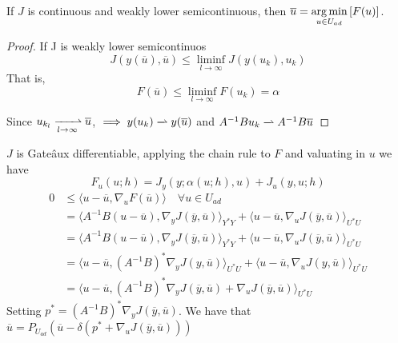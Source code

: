 \begin{proposition}
	If $J$ is continuous and weakly lower semicontinuous, then 	$\overline{u}={\displaystyle {\underset {u\in U_{ad}}{\operatorname {arg\,min} }}\left[F(u)\right]}$.
	\begin{proof}
		If J is weakly lower semicontinuos 
			\[
				J(y(\overline{u}), \overline{u})\leq \liminf_{l\rightarrow \infty} J(y(u_k),u_k)
			\]
		That is, 
		\[
			F(\overline{u}) \leq \liminf_{l\rightarrow \infty} F(u_k) =\alpha 
		\]

	
	Since $u_{k_{l}} \xrightharpoonup[l\rightarrow \infty]{} \overline{u}$, $\implies y(u_k) \xrightharpoonup[]{} y(\overline{u})$ and $A^{-1}B u_k \xrightharpoonup[]{}A^{-1}B  \overline{u}$
	\end{proof}
\end{proposition}
	$J$ is Gate\^aux differentiable, applying the chain rule to $F$ and valuating in $u$ we have
	\[
		F_u(u; h)=J_y(y; \alpha(u;h), u)+J_u(y,u;h)
	\]
	\begin{align*}
		0 &\leq \langle u-\overline{u}, \nabla_u F(\overline{u}) \rangle \quad \forall u \in U_{ad}\\
		&= \langle A^{-1}B(u -\overline{u}), 
		\nabla_y J(\overline{y}, \overline{u}) \rangle_{Y^*Y}+\langle u-\overline{u},  \nabla_u J(\overline{y},\overline{u})\rangle_{U^*U} \\
		&= \langle A^{-1}B(u -\overline{u}), 
		\nabla_y J(\overline{y}, \overline{u}) \rangle_{Y^*Y}+\langle u-\overline{u},  \nabla_u J(\overline{y},\overline{u})\rangle_{U^*U} \\
		&= \langle u -\overline{u}, 
		(A^{-1}B)^*\nabla_y J(y, \overline{u}) \rangle_{U^*U}+\langle u-\overline{u},  \nabla_u J(y,\overline{u})\rangle_{U^*U} \\
		&= \langle u -\overline{u}, 
		(A^{-1}B)^*\nabla_y J(\overline{y}, \overline{u})+\nabla_u J(\overline{y},\overline{u})\rangle_{U^*U}
	\end{align*}
	Setting $p^*=(A^{-1}B)^*\nabla_y J(\overline{y}, \overline{u})$. We have that $\overline{u}=P_{U_{ad}}(\overline{u}-\delta(p^*+\nabla_u J(\overline{y}, \overline{u})))$
